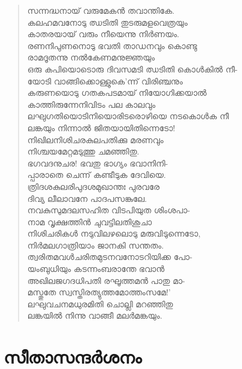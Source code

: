 \begin{verse}
സന്നദ്ധനായ് വരുമേകന്‍ തവാന്തികേ.\\
കലഹമവനോടു ഝടിതി തുടരുമളവെത്രയും\\
കാതരയായ് വരും നീയെന്നു നിര്‍ണയം.\\
രണനിപുണനൊടു ഭവതി താഡനവും കൊണ്ടു\\
രാമദൂതന്നു നല്‍കേണമനുജ്ഞയും\\
ഒരു കപിയൊടൊരു ദിവസമടി ഝടിതി കൊള്‍കില്‍ നീ-\\
യോടി വാങ്ങിക്കൊള്ളുകെ’ന്ന് വിരിഞ്ചനും\\
കരുണയൊടു ഗതകപടമായ് നിയോഗിക്കയാല്‍\\
കാത്തിരുന്നേനിവിടം പല കാലവും\\
ലഘുഗതിയൊടിനിയൊരിടരൊഴിയെ നടകൊള്‍ക നീ\\
ലങ്കയും നിന്നാല്‍ ജിതയായിതിന്നെടോ!\\
നിഖിലനിശിചരകുലപതിക്കു മരണവും\\
നിശ്ചയമേറ്റമടുത്തു ചമഞ്ഞിതു.\\
ഭഗവദനുചര! ഭവതു ഭാഗ്യം ഭവാനിനി-\\
പ്പാരാതെ ചെന്ന് കണ്ടീടുക ദേവിയെ.\\
ത്രിദശകുലരിപുദശമുഖാന്തഃ പുരവരേ\\
ദിവ്യ ലീലാവനേ പാദപസങ്കുലേ.\\
നവകുസുമദലസഹിത വിടപിയുത ശിംശപാ-\\
നാമ വൃക്ഷത്തിന്‍ ചുവട്ടിലതിശുചാ\\
നിശിചരികള്‍ നടുവിലഴലൊടു മരുവിടുന്നെടോ,\\
നിര്‍മലഗാത്രിയാം ജാനകി സന്തതം.\\
ത്വരിതമവള്‍ചരിതമുടനവനോടറിയിക്ക പോ-\\
യംബുധിയും കടന്നംബരാന്തേ ഭവാന്‍\\
അഖിലജഗദധിപതി രഘൂത്തമന്‍ പാതു മാ-\\
മസ്തുതേ സ്വസ്തിരത്യുത്തമോത്തംസമേ!’\\
ലഘുവചനമധുരമിതി ചൊല്ലി മറഞ്ഞിതു\\
ലങ്കയില്‍ നിന്നു വാങ്ങീ മലര്‍മങ്കയും.
\end{verse}


\section{സീതാസന്ദര്‍ശനം}

